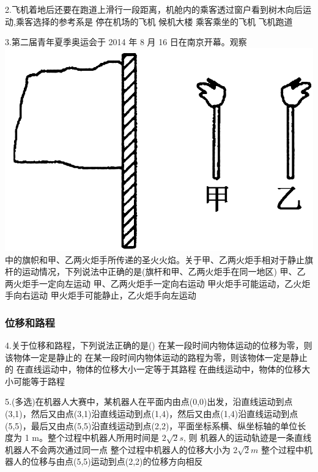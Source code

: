 \documentclass[a4paper,fontset = windows]{ctexbook} %
\begin{document}
\begin{xuanze}
   2.飞机着地后还要在跑道上滑行一段距离，机舱内的乘客透过窗户看到树木向后运动,乘客选择的参考系是
   \choice[A]停在机场的飞机
   \choice[B]候机大楼
   \choice[C]乘客乘坐的飞机
   \choice[D]飞机跑道

   3.第二届青年夏季奥运会于 2014 年 8 月 16 日在南京开幕。观察
   \includegraphics{../picture/1-1/001.png}
   中的旗帜和甲、乙两火炬手所传递的圣火火焰。关于甲、乙两火炬手相对于静止旗杆的运动情况，下列说法中正确的是(旗杆和甲、乙两火炬手在同一地区)
   \choice[A]甲、乙两火炬手一定向左运动
   \choice[B]甲、乙两火炬手一定向右运动
   \choice[C]甲火炬手可能运动，乙火炬手向右运动
   \choice[D]甲火炬手可能静止，乙火炬手向左运动
\end{xuanze}

\subsubsection{位移和路程}

\begin{xuanze}
   4.关于位移和路程，下列说法正确的是()
   \choice[A]在某一段时间内物体运动的位移为零，则该物体一定是静止的
   \choice[B]在某一段时间内物体运动的路程为零，则该物体一定是静止的
   \choice[C]在直线运动中，物体的位移大小一定等于其路程
   \choice[D]在曲线运动中，物体的位移大小可能等于路程

   5.(多选)在机器人大赛中，某机器人在平面内由点(0,0)出发，沿直线运动到点(3,1)，然后又由点(3,1)沿直线运动到点(1,4)，然后又由点(1,4)沿直线运动到点(5,5)，最后又由点(5,5)沿直线运动到点(2,2)，平面坐标系横、纵坐标轴的单位长度为 1 m。整个过程中机器人所用时间是 $2\sqrt{2}s$, 则
   \choice[A]机器人的运动轨迹是一条直线
   \choice[B]机器人不会两次通过同一点
   \choice[C]整个过程中机器人的位移大小为 $2\sqrt{2} m$
   \choice[D]整个过程中机器人的位移与由点(5,5)运动到点(2,2)的位移方向相反

\end{xuanze}
\end{document}
